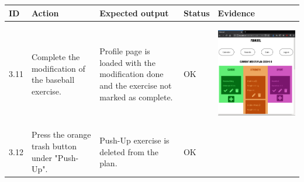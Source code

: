 \documentclass[12pt,twoside,titlepage,a4paper]{article}
\theoremstyle{definicion}
\theoremstyle{lema}
\theoremstyle{teorema}
\theoremstyle{corolario}
\theoremstyle{ejemplo}
\theoremstyle{nota}
\begin{document}
\begin{table}[!h]
	\centering
	\begin{tabular}{|m{0.6cm}|m{2.9cm}|m{3.6cm}|m{1.1cm}|m{5.9cm}|}
		\hline
		\textbf{ID} & \textbf{Action} & \textbf{Expected output} & \textbf{Status} & \textbf{Evidence} \\ 
		\hline
		3.11 & Complete the modification of the baseball exercise. & Profile page is loaded with the modification
		done and the exercise not marked as complete. & OK &
		\begin{center}\includegraphics[scale=0.22]{modifysport-userpage7.png}\end{center} \\
		\hline
		3.12 & Press the orange trash button under "Push-Up". & Push-Up exercise is deleted from the plan. & OK &

\end{tabular}
\end{table}
\end{document}
